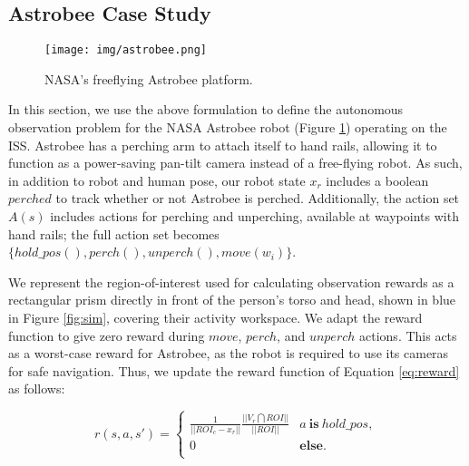 \documentclass[letterpaper, 10 pt, conference]{ieeeconf}  %
\begin{document}
\subsection{Astrobee Case Study}

\begin{figure}[t]
\centering
\texttt{[image: img/astrobee.png]}
\caption{NASA's freeflying Astrobee platform.}
\label{fig:astrobee}
\vspace{-0.3cm}
\end{figure}

In this section, we use the above formulation to define the autonomous observation problem for the NASA Astrobee robot (Figure \ref{fig:astrobee}) operating on the ISS.  Astrobee has a perching arm to attach itself to hand rails, allowing it to function as a power-saving pan-tilt camera instead of a free-flying robot.  As such, in addition to robot and human pose, our robot state $x_r$ includes a boolean $perched$ to track whether or not Astrobee is perched.  Additionally, the action set $A(s)$ includes actions for perching and unperching, available at waypoints with hand rails; the full action set becomes $\{hold\_pos(), perch(), unperch(), move(w_i)\}$.

We represent the region-of-interest used for calculating observation rewards as a rectangular prism directly in front of the person's torso and head, shown in blue in Figure \ref{fig:sim}, covering their activity workspace.  We adapt the reward function to give zero reward during $move$, $perch$, and $unperch$ actions.  This acts as a worst-case reward for Astrobee, as the robot is required to use its cameras for safe navigation.  Thus, we update the reward function of Equation \ref{eq:reward} as follows:

\begin{equation}
r(s,a,s') = \begin{cases}
\frac{1}{||ROI_{c} - x_r||}\frac{||V_r \bigcap ROI||}{||ROI||} & a\: \mathbf{is}\: hold\_pos,\\
0 & \mathbf{else}.\\
\end{cases}
\end{equation}
\end{document}
